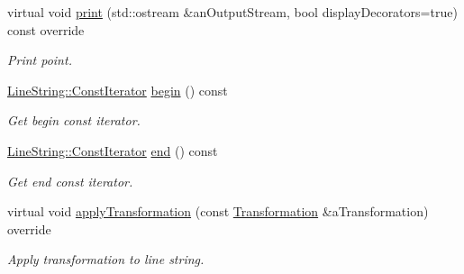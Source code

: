 \begin{DoxyCompactItemize}
virtual void \hyperlink{classlibrary_1_1math_1_1geom_1_1d2_1_1objects_1_1_line_string_ae980ac86d1f2d8091151252aef2b6adc}{print} (std\+::ostream \&an\+Output\+Stream, bool display\+Decorators=true) const override
\begin{DoxyCompactList}\small\item\em Print point. \end{DoxyCompactList}\item 
\hyperlink{classlibrary_1_1math_1_1geom_1_1d2_1_1objects_1_1_line_string_a7c7a81b557da8ed855b5f4b88a5fa837}{Line\+String\+::\+Const\+Iterator} \hyperlink{classlibrary_1_1math_1_1geom_1_1d2_1_1objects_1_1_line_string_af2e6ff6ec6714eb64bda3c270c92469d}{begin} () const
\begin{DoxyCompactList}\small\item\em Get begin const iterator. \end{DoxyCompactList}\item 
\hyperlink{classlibrary_1_1math_1_1geom_1_1d2_1_1objects_1_1_line_string_a7c7a81b557da8ed855b5f4b88a5fa837}{Line\+String\+::\+Const\+Iterator} \hyperlink{classlibrary_1_1math_1_1geom_1_1d2_1_1objects_1_1_line_string_af86afe62a24b648504822b3adc6c5ecd}{end} () const
\begin{DoxyCompactList}\small\item\em Get end const iterator. \end{DoxyCompactList}\item 
virtual void \hyperlink{classlibrary_1_1math_1_1geom_1_1d2_1_1objects_1_1_line_string_abd9e77eb0e1d319e8f9af23ccb6dc0b4}{apply\+Transformation} (const \hyperlink{classlibrary_1_1math_1_1geom_1_1d2_1_1_transformation}{Transformation} \&a\+Transformation) override
\begin{DoxyCompactList}\small\item\em Apply transformation to line string. \end{DoxyCompactList}\end{DoxyCompactItemize}
